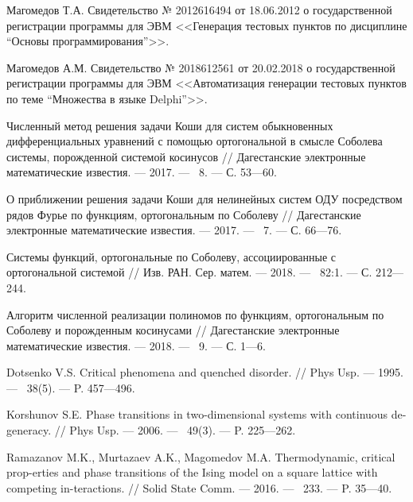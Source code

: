 \begin{thebibliography}{111}
Магомедов Т.А. Свидетельство № 2012616494 от 18.06.2012 о государственной регистрации программы для ЭВМ <<Генерация тестовых пунктов по дисциплине “Основы программирования”>>.

Магомедов А.М. Свидетельство № 2018612561 от 20.02.2018 о государственной регистрации программы для ЭВМ <<Автоматизация генерации тестовых пунктов по теме “Множества в языке Delphi”>>.






 Численный метод решения задачи Коши для систем обыкновенных дифференциальных уравнений с помощью ортогональной в смысле Соболева системы, порожденной системой косинусов // Дагестанские электронные математические известия. --- 2017. --- \No\ 8. --- С. 53---60.

 О приближении решения задачи Коши для нелинейных систем ОДУ посредством рядов Фурье по функциям, ортогональным по Соболеву // Дагестанские электронные математические известия. --- 2017. --- \No\ 7. --- С. 66---76.

 Системы функций, ортогональные по Соболеву, ассоциированные с ортогональной системой // Изв. РАН. Сер. матем. --- 2018. --- \No\  82:1. --- С. 212---244.

 Алгоритм численной реализации полиномов по функциям, ортогональным по Соболеву и порожденным косинусами // Дагестанские электронные математические известия. --- 2018. --- \No\ 9. --- С. 1---6.










Dotsenko V.S. Critical phenomena and quenched disorder. //
Phys Usp. --- 1995. --- \No\ 38(5). --- P. 457---496.

Korshunov S.E. Phase transitions in two-dimensional systems with continuous de-generacy. //
Phys Usp. --- 2006. --- \No\ 49(3). --- P. 225–--262.

Ramazanov M.K., Murtazaev A.K., Magomedov M.A.
Thermodynamic, critical prop-erties and phase transitions of the Ising model on a square lattice with competing in-teractions. //
Solid State Comm. --- 2016. --- \No\ 233. --- P. 35---40.


\end{thebibliography}
